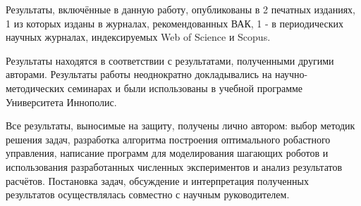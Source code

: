 {\reliability} 

Результаты, включённые в данную работу, опубликованы в 2 печатных изданиях, 1 из которых изданы в журналах, рекомендованных ВАК, 1 - в периодических научных журналах, индексируемых Web of Science и Scopus. 

Результаты находятся в соответствии с результатами, полученными другими авторами. Результаты работы неоднократно докладывались на научно-методических семинарах и были использованы в учебной программе Университета Иннополис.

{\contribution} 

Все результаты, выносимые на защиту, получены лично автором: выбор методик решения задач, разработка алгоритма построения оптимального робастного управления, написание программ для моделирования шагающих роботов и использования разработанных численных экспериментов и анализ результатов расчётов. Постановка задач, обсуждение и интерпретация полученных результатов осуществлялась совместно с научным руководителем.